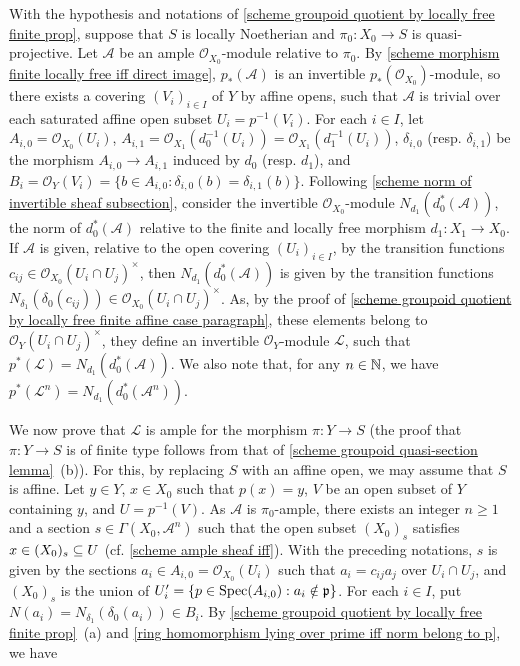 \begin{remark}
With the hypothesis and notations of \cref{scheme groupoid quotient by locally free finite prop}, suppose that $S$ is locally Noetherian and $\pi_0:X_0\to S$ is quasi-projective. Let $\mathscr{A}$ be an ample $\mathscr{O}_{X_0}$-module relative to $\pi_0$. By \cref{scheme morphism finite locally free iff direct image}, $p_*(\mathscr{A})$ is an invertible $p_*(\mathscr{O}_{X_0})$-module, so there exists a covering $(V_i)_{i\in I}$ of $Y$ by affine opens, such that $\mathscr{A}$ is trivial over each saturated affine open subset $U_i=p^{-1}(V_i)$. For each $i\in I$, let $A_{i,0}=\mathscr{O}_{X_0}(U_i)$, $A_{i,1}=\mathscr{O}_{X_1}(d_0^{-1}(U_i))=\mathscr{O}_{X_1}(d_1^{-1}(U_i))$, $\delta_{i,0}$ (resp. $\delta_{i,1}$) be the morphism $A_{i,0}\to A_{i,1}$ induced by $d_0$ (resp. $d_1$), and $B_i=\mathscr{O}_Y(V_i)=\{b\in A_{i,0}:\delta_{i,0}(b)=\delta_{i,1}(b)\}$. Following \autoref{scheme norm of invertible sheaf subsection}, consider the invertible $\mathscr{O}_{X_0}$-module $N_{d_1}(d_0^*(\mathscr{A}))$, the norm of $d_0^*(\mathscr{A})$ relative to the finite and locally free morphism $d_1:X_1\to X_0$. If $\mathscr{A}$ is given, relative to the open covering $(U_i)_{i\in I}$, by the transition functions $c_{ij}\in\mathscr{O}_{X_0}(U_i\cap U_j)^{\times}$, then $N_{d_1}(d_0^*(\mathscr{A}))$ is given by the transition functions $N_{\delta_1}(\delta_0(c_{ij}))\in\mathscr{O}_{X_0}(U_i\cap U_j)^\times$. As, by the proof of \ref{scheme groupoid quotient by locally free finite affine case paragraph}, these elements belong to $\mathscr{O}_Y(U_i\cap U_j)^\times$, they define an invertible $\mathscr{O}_Y$-module $\mathscr{L}$, such that $p^*(\mathscr{L})=N_{d_1}(d_0^*(\mathscr{A}))$. We also note that, for any $n\in\mathbb{N}$, we have $p^*(\mathscr{L}^n)=N_{d_1}(d_0^*(\mathscr{A}^n))$.\par
We now prove that $\mathscr{L}$ is ample for the morphism $\pi:Y\to S$ (the proof that $\pi:Y\to S$ is of finite type follows from that of \cref{scheme groupoid quasi-section lemma}~(b)). For this, by replacing $S$ with an affine open, we may assume that $S$ is affine. Let $y\in Y$, $x\in X_0$ such that $p(x)=y$, $V$ be an open subset of $Y$ containing $y$, and $U=p^{-1}(V)$. As $\mathscr{A}$ is $\pi_0$-ample, there exists an integer $n\geq 1$ and a section $s\in\Gamma(X_0,\mathscr{A}^n)$ such that the open subset $(X_0)_s$ satisfies $x\in (X_0)_s\subseteq U$ (cf. \cref{scheme ample sheaf iff}). With the preceding notations, $s$ is given by the sections $a_i\in A_{i,0}=\mathscr{O}_{X_0}(U_i)$ such that $a_i=c_{ij}a_j$ over $U_i\cap U_j$, and $(X_0)_s$ is the union of $U_i'=\{p\in\mathrm{Spec}(A_{i,0}):a_i\notin\mathfrak{p}\}$. For each $i\in I$, put $N(a_i)=N_{\delta_1}(\delta_0(a_i))\in B_i$. By \cref{scheme groupoid quotient by locally free finite prop}~(a) and \cref{ring homomorphism lying over prime iff norm belong to p}, we have

\end{remark}
